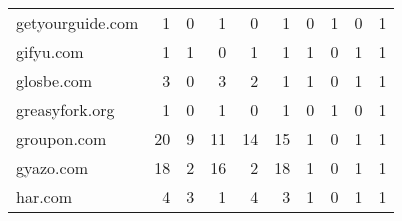 \begin{tabular}{lrrrrrrrrr}
           getyourguide.com &                                1 &                                  0 &                                      1 &                            0 &                           1 &                                   0 &                                      1 &                             0 &                            1 \\
                  gifyu.com &                                1 &                                  1 &                                      0 &                            1 &                           1 &                                   1 &                                      0 &                             1 &                            1 \\
                 glosbe.com &                                3 &                                  0 &                                      3 &                            2 &                           1 &                                   1 &                                      0 &                             1 &                            1 \\
             greasyfork.org &                                1 &                                  0 &                                      1 &                            0 &                           1 &                                   0 &                                      1 &                             0 &                            1 \\
                groupon.com &                               20 &                                  9 &                                     11 &                           14 &                          15 &                                   1 &                                      0 &                             1 &                            1 \\
                  gyazo.com &                               18 &                                  2 &                                     16 &                            2 &                          18 &                                   1 &                                      0 &                             1 &                            1 \\
                    har.com &                                4 &                                  3 &                                      1 &                            4 &                           3 &                                   1 &                                      0 &                             1 &                            1 \\

\end{tabular}
